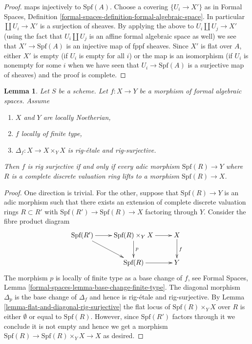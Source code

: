 \documentclass{stacks-project}
\theoremstyle{plain}
\newtheorem{lemma}[subsection]{Lemma}
\theoremstyle{definition}
\theoremstyle{remark}
\numberwithin{equation}{subsection}
\begin{document}
\begin{proof}
maps injectively to $\text{Spf}(A)$.
Choose a covering $\{U_i \to X'\}$ as in Formal Spaces, Definition
\ref{formal-spaces-definition-formal-algebraic-space}.
In particular $\coprod U_i \to X'$ is a surjection of sheaves.
By applying the above to $U_i \coprod U_j \to X'$ (using the
fact that $U_i \amalg U_j$ is an affine formal algebraic space
as well) we see that $X' \to \text{Spf}(A)$ is an injective map
of fppf sheaves. Since $X'$ is flat over $A$, either $X'$ is empty
(if $U_i$ is empty for all $i$) or the map is an isomorphism
(if $U_i$ is nonempty for some $i$ when we have seen that
$U_i \to \text{Spf}(A)$ is a surjective map of sheaves)
and the proof is complete.
\end{proof}

\begin{lemma}
\label{lemma-rig-monomorphism-rig-surjective}
Let $S$ be a scheme. Let $f : X \to Y$ be a morphism of formal algebraic
spaces. Assume
\begin{enumerate}
\item $X$ and $Y$ are locally Noetherian,
\item $f$ locally of finite type,
\item $\Delta_f : X \to X \times_Y X$ is rig-\'etale and rig-surjective.
\end{enumerate}
Then $f$ is rig surjective if and only if every adic morphism
$\text{Spf}(R) \to Y$ where $R$ is a complete discrete
valuation ring lifts to a morphism $\text{Spf}(R) \to X$.
\end{lemma}

\begin{proof}
One direction is trivial. For the other, suppose that $\text{Spf}(R) \to Y$
is an adic morphism such that there exists an extension of complete
discrete valuation rings $R \subset R'$ with
$\text{Spf}(R') \to \text{Spf}(R) \to X$ factoring through $Y$.
Consider the fibre product diagram
$$
\xymatrix{
\text{Spf}(R') \ar[r] \ar[rd] &
\text{Spf}(R) \times_Y X \ar[r] \ar[d]^p &
X \ar[d]^f \\
&
\text{Spf}(R) \ar[r] &
Y
}
$$
The morphism $p$ is locally of finite type as a base change of $f$, see
Formal Spaces, Lemma
\ref{formal-spaces-lemma-base-change-finite-type}.
The diagonal morphism $\Delta_p$ is the base change of
$\Delta_f$ and hence is rig-\'etale and rig-surjective.
By Lemma \ref{lemma-flat-and-diagonal-rig-surjective}
the flat locus of $\text{Spf}(R) \times_Y X$ over $R$
is either $\emptyset$ or equal to $\text{Spf}(R)$.
However, since $\text{Spf}(R')$ factors through it
we conclude it is not empty and hence
we get a morphism $\text{Spf}(R) \to \text{Spf}(R) \times_Y X \to X$
as desired.
\end{proof}
\end{document}
